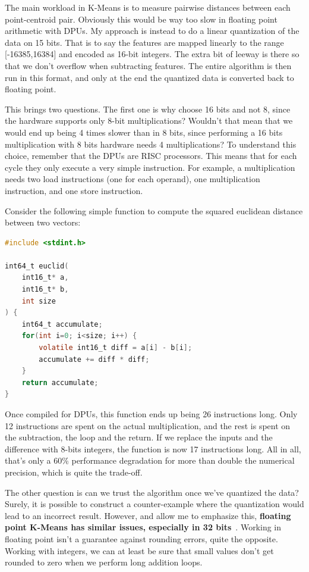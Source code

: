 The main workload in K-Means is to measure pairwise distances between each point-centroid pair. Obviously this would be way too slow in floating point arithmetic with DPUs. My approach is instead to do a linear quantization of the data on 15 bits. That is to say the features are mapped linearly to the range [-16385,16384] and encoded as 16-bit integers. The extra bit of leeway is there so that we don't overflow when subtracting features. The entire algorithm is then run in this format, and only at the end the quantized data is converted back to floating point.

This brings two questions. The first one is why choose 16 bits and not 8, since the hardware supports only 8-bit multiplications? Wouldn't that mean that we would end up being 4 times slower than in 8 bits, since performing a 16 bits multiplication with 8 bits hardware needs 4 multiplications? To understand this choice, remember that the DPUs are RISC processors. This means that for each cycle they only execute a very simple instruction. For example, a multiplication needs two load instructions (one for each operand), one multiplication instruction, and one store instruction.

Consider the following simple function to compute the squared euclidean distance between two vectors:
\begin{lstlisting}[language=C]
#include <stdint.h>

int64_t euclid(
    int16_t* a,
    int16_t* b,
    int size
) {
    int64_t accumulate;
    for(int i=0; i<size; i++) {
        volatile int16_t diff = a[i] - b[i];
        accumulate += diff * diff;
    }
    return accumulate;
}    
\end{lstlisting}

Once compiled for DPUs, this function ends up being 26 instructions long. Only 12 instructions are spent on the actual multiplication, and the rest is spent on the subtraction, the loop and the return. If we replace the inputs and the difference with 8-bits integers, the function is now 17 instructions long. All in all, that's only a 60\% performance degradation for more than double the numerical precision, which is quite the trade-off.

The other question is can we trust the algorithm once we've quantized the data? Surely, it is possible to construct a counter-example where the quantization would lead to an incorrect result. However, and allow me to emphasize this, \textbf{floating point K-Means has similar issues, especially in 32 bits}~\cite{jezequel:hal-02486753}. Working in floating point isn't a guarantee against rounding errors, quite the opposite. Working with integers, we can at least be sure that small values don't get rounded to zero when we perform long addition loops.

